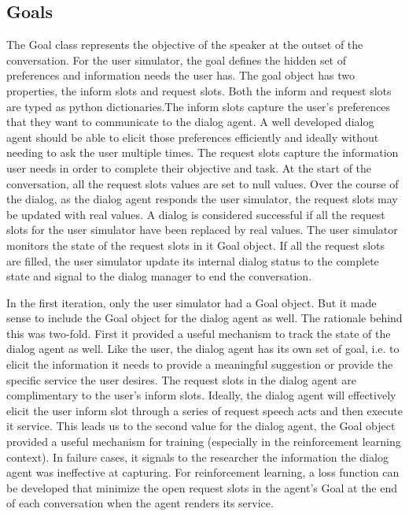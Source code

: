 \subsection{Goals}

The Goal class represents the objective of the speaker at the outset of the conversation. For the user simulator, the goal defines the hidden set of preferences and information needs the user has. The goal object has two properties, the inform slots and request slots. Both the inform and request slots are typed as python dictionaries.The inform slots capture the user's preferences that they want to communicate to the dialog agent. A well developed dialog agent should be able to elicit those preferences efficiently and ideally without needing to ask the user multiple times. The request slots capture the information user needs in order to complete their objective and task. At the start of the conversation, all the request slots values are set to null values. Over the course of the dialog, as the dialog agent responds the user simulator, the request slots may be updated with real values. A dialog is considered successful if all the request slots for the user simulator have been replaced by real values. The user simulator monitors the state of the request slots in it Goal object. If all the request slots are filled, the user simulator update its internal dialog status to the complete state and signal to the dialog manager to end the conversation. 

In the first iteration, only the user simulator had a Goal object. But it made sense to include the Goal object for the dialog agent as well. The rationale behind this was two-fold. First it provided a useful mechanism to track the state of the dialog agent as well. Like the user, the dialog agent has its own set of goal, i.e. to elicit the information it needs to provide a meaningful suggestion or provide the specific service the user desires. The request slots in the dialog agent are complimentary to the user's inform slots. Ideally, the dialog agent will effectively elicit the user inform slot through a series of request speech acts and then execute it service. This leads us to the second value for the dialog agent, the Goal object provided a useful mechanism for training (especially in the reinforcement learning context). In failure cases, it signals to the researcher the information the dialog agent was ineffective at capturing. For reinforcement learning, a loss function can be developed that minimize the open request slots in the agent's Goal at the end of each conversation when the agent renders its service. 

